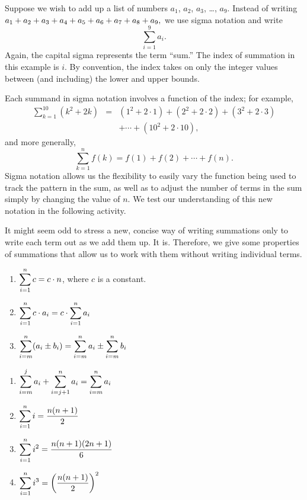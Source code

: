 Suppose we wish to add up a list of numbers $a_1$, $a_2$, $a_3$, \ldots, $a_9$. Instead of writing $\displaystyle a_1+a_2+a_3+a_4+a_5+a_6+a_7+a_8+a_9,$
we use sigma notation and write 
\[ \sum_{i=1}^9 a_i. \]
Again, the capital sigma represents the term ``sum.'' The index of summation in this example is $i$. By convention, the index takes on only the integer values between (and including) the lower and upper bounds. 

Each summand in sigma notation involves a function of the index; for example,
\begin{eqnarray*}
\sum_{k=1}^{10} (k^2 + 2k) & = & (1^2 + 2\cdot 1) + (2^2 + 2\cdot 2) + (3^2 + 2\cdot 3) \\
& & + \cdots + (10^2 + 2\cdot 10),
\end{eqnarray*}
and more generally,
$$\sum_{k=1}^n f(k) = f(1) + f(2) + \cdots + f(n).$$
Sigma notation allows us the flexibility to easily vary the function being used to track the pattern in the sum, as well as to adjust the number of terms in the sum simply by changing the value of $n$.  We test our understanding of this new notation in the following activity.


It might seem odd to stress a new, concise way of writing summations only to write each term out as we add them up. It is. Therefore, we give some properties of summations that allow us to work with them without writing individual terms. 

{
\begin{enumerate}[1)]
\item	$\displaystyle \sum_{i=1}^n c = c\cdot n$, where $c$ is a constant.
\item	$\displaystyle \sum_{i=1}^n c\cdot a_i = c\cdot\sum_{i=1}^n a_i$
\item	$\displaystyle \sum_{i=m}^n (a_i\pm b_i) = \sum_{i=m}^n a_i \pm \sum_{i=m}^n b_i$
\end{enumerate}
\begin{multicols}{2}
\begin{enumerate}[1),resume]
\item	$\displaystyle \sum_{i=m}^j a_i + \sum_{i=j+1}^n  a_i = \sum_{i=m}^n a_i$
\item	$\displaystyle \sum_{i=1}^n i = \frac{n(n+1)}2$
\item	$\displaystyle \sum_{i=1}^n i^2 = \frac{n(n+1)(2n+1)}6$
\item	$\displaystyle \sum_{i=1}^n i^3 = \left(\frac{n(n+1)}2\right)^2$
\end{enumerate}
\end{multicols}
$\left.\right.$
} %

